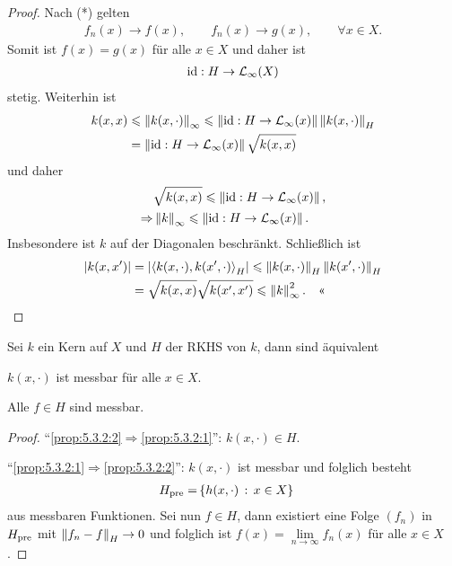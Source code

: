 \begin{proof}
Nach (*) gelten
\begin{align*}
f_n(x)\to f(x),\qquad f_n(x)\to g(x),\qquad \forall x\in X.
\end{align*}
Somit ist $f(x) = g(x)$ für alle $x\in X$ und daher ist
\begin{align*}
\operatorname{id} : H\to \mathcal{L}_\infty(X)
\end{align*}
stetig. Weiterhin ist
\begin{align*}
k(x,x) &\leqslant \left\|k(x,\cdot)\right\|_\infty
\leqslant \left\|\operatorname{id}: H \to \mathcal{L}_\infty(x)\right\|\left\|k(x,\cdot)\right\|_H\\
&= \left\|\operatorname{id}: H\to \mathcal{L}_\infty(x)\right\|\sqrt{k(x,x)}
\end{align*}
und daher
\begin{align*}
&\sqrt{k(x,x)} \leqslant \left\|\operatorname{id}: H\to \mathcal{L}_\infty(x)\right\|,\\
\Rightarrow &
\left\|k\right\|_\infty \leqslant  \left\|\operatorname{id}: H\to \mathcal{L}_\infty(x)\right\|.
\end{align*}
Insbesondere ist $k$ auf der Diagonalen beschränkt. Schließlich ist
\begin{align*}
\left|k(x,x')\right| &= \left|\left\langle k(x,\cdot),k(x',\cdot)\right\rangle_H\right|
\leqslant \left\|k(x,\cdot)\right\|_H\left\|k(x',\cdot)\right\|_H\\
&= \sqrt{k(x,x)}\sqrt{k(x',x')}
\leqslant \left\|k\right\|_\infty^2.\quad\text{<<}
\end{align*}
\end{proof}

\begin{lem}
\label{prop:5.3.2}
Sei $k$ ein Kern auf $X$ und $H$ der RKHS von $k$, dann sind äquivalent
\begin{equivenum}
\item\label{prop:5.3.2:1} $k(x,\cdot)$ ist messbar für alle $x\in X$.
\item\label{prop:5.3.2:2} Alle $f\in H$ sind messbar.\fishhere
\end{equivenum}
\end{lem}
\begin{proof}
"`\ref{prop:5.3.2:2}$\Rightarrow$\ref{prop:5.3.2:1}"': $k(x,\cdot)\in H$.

"`\ref{prop:5.3.2:1}$\Rightarrow$\ref{prop:5.3.2:2}"': $k(x,\cdot)$ ist messbar
und folglich besteht
\begin{align*}
H_\pre = \span \setdef{h(x,\cdot)}{x\in X}
\end{align*}
aus messbaren Funktionen. Sei nun $f\in H$, dann existiert eine Folge $(f_n)$ in
$H_{\mathrm{pre}}$ mit $\left\|f_n-f\right\|_H\to 0$ und folglich ist $f(x) =
\lim\limits_{n\to\infty} f_n(x)$ für alle $x\in X$.\qedhere
\end{proof}

